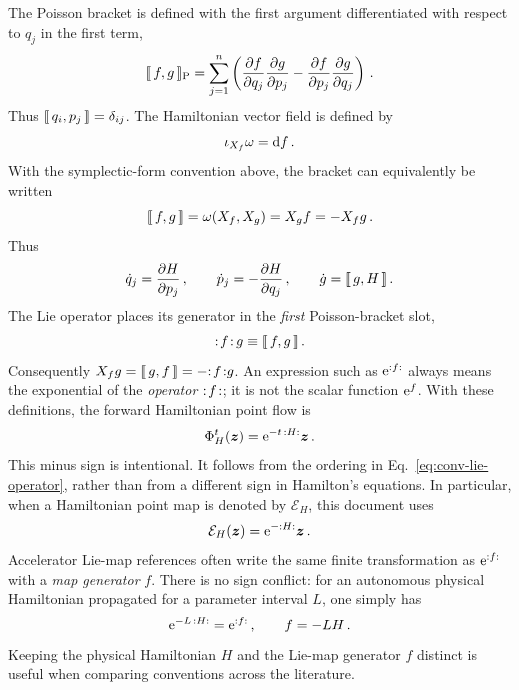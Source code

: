 The Poisson bracket is defined with the first argument differentiated with
respect to $q_j$ in the first term,
\begin{equation}\label{eq:conv-poisson}
    \llbracket \, f,g\,\rrbracket_{\mathrm P} = \sum_{j = 1}^n\left(
        \frac{\partial {f}}{\partial {q_j}}\frac{\partial {g}}{\partial {p_j}}
        - \frac{\partial {f}}{\partial {p_j}}\frac{\partial {g}}{\partial {q_j}}
    \right)\,.
\end{equation}
Thus $\llbracket \, q_i,p_j\,\rrbracket = \delta_{ij}$.  The Hamiltonian vector field is
defined by
\begin{equation}\label{eq:conv-hamiltonian-vector-field}
    \iota_{X_f}\omega = \text{d} f\,.
\end{equation}
With the symplectic-form convention above, the bracket can equivalently be
written
\begin{equation}\label{eq:conv-poisson-geometric}
    \llbracket \, f,g\,\rrbracket = \omega(X_f,X_g) = X_g f = -X_f g\,.
\end{equation}
Thus
\begin{equation}\label{eq:conv-hamilton-equations}
    \dot q_j = \frac{\partial {H}}{\partial {p_j}}\,,
    \qquad
    \dot p_j = -\frac{\partial {H}}{\partial {q_j}}\,,
    \qquad
    \dot g = \llbracket \, g,H\,\rrbracket\,.
\end{equation}
The Lie operator places its generator in the \emph{first} Poisson-bracket
slot,
\begin{equation}\label{eq:conv-lie-operator}
    {\ensuremath{:\!{f}\!:}}\,g \equiv \llbracket \, f,g\,\rrbracket\,.
\end{equation}
Consequently $X_f g = \llbracket \, g,f\,\rrbracket = -{:\!{f}\!:}g$.  An expression such as
$\mathrm{e}^{{:{f}:}}$ always means the exponential of the \emph{operator} ${:\!{f}\!:}$;
it is not the scalar function $\mathrm{e}^f$.  With these definitions, the forward
Hamiltonian point flow is
\begin{equation}\label{eq:conv-forward-flow}
    \Phi_H^t(\bm{z}) = \mathrm{e}^{-t\,{:{H}:}}\bm{z}\,.
\end{equation}
This minus sign is intentional.  It follows from the ordering in
Eq.~\eqref{eq:conv-lie-operator}, rather than from a different sign in
Hamilton's equations.  In particular, when a Hamiltonian point map is denoted
by $\mathcal E_H$, this document uses
\begin{equation}\label{eq:conv-EH}
    \mathcal E_H(\bm{z}) = \mathrm{e}^{-{:{H}:}}\bm{z}\,.
\end{equation}
Accelerator Lie-map references often write the same finite transformation as
$\mathrm{e}^{{:{f}:}}$ with a \emph{map generator} $f$.  There is no sign conflict:
for an autonomous physical Hamiltonian propagated for a parameter interval
$L$, one simply has
\begin{equation}\label{eq:conv-map-generator}
    \mathrm{e}^{-L\,{:{H}:}} = \mathrm{e}^{{:{f}:}}\,,
    \qquad f = -L H\,.
\end{equation}
Keeping the physical Hamiltonian $H$ and the Lie-map generator $f$ distinct
is useful when comparing conventions across the literature.



